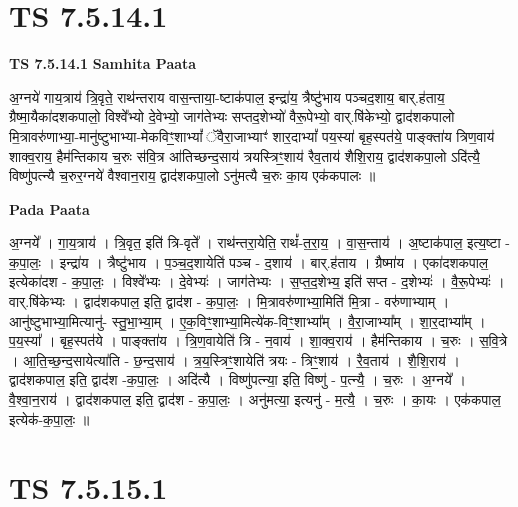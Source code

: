 \documentclass[17pt]{extarticle}
\begin{document}

\section{ TS 7.5.14.1 }

\textbf{TS 7.5.14.1 } \newline
\textbf{Samhita Paata} \newline

अ॒ग्नये॑ गाय॒त्राय॑ त्रि॒वृते॒ राथ॑न्तराय वास॒न्ताया॒-ष्टाक॑पाल॒ इन्द्रा॑य॒ त्रैष्टु॑भाय पञ्चद॒शाय॒ बार्.ह॑ताय॒ ग्रैष्मा॒यैका॑दशकपालो॒ विश्वे᳚भ्यो दे॒वेभ्यो॒ जाग॑तेभ्यः सप्तद॒शेभ्यो॑ वैरू॒पेभ्यो॒ वार्.षि॑केभ्यो॒ द्वाद॑शकपालो मि॒त्रावरु॑णाभ्या॒-मानु॑ष्टुभाभ्या-मेकविꣳ॒॒शाभ्यां᳚ ॅवैरा॒जाभ्याꣳ॑ शार॒दाभ्यां᳚ पय॒स्या॑ बृह॒स्पत॑ये॒ पाङ्क्ता॑य त्रिण॒वाय॑ शाक्व॒राय॒ हैम॑न्तिकाय च॒रुः स॑वि॒त्र आ॑तिच्छन्द॒साय॑ त्रयस्त्रिꣳ॒॒शाय॑ रैव॒ताय॑ शैशि॒राय॒ द्वाद॑शकपा॒लो ऽदि॑त्यै॒ विष्णु॑पत्न्यै च॒रुर॒ग्नये॑ वैश्वान॒राय॒ द्वाद॑शकपा॒लो ऽनु॑मत्यै च॒रुः का॒य एक॑कपालः ॥ \newline

\textbf{Pada Paata} \newline

अ॒ग्नये᳚ । गा॒य॒त्राय॑ । त्रि॒वृत॒ इति॑ त्रि-वृते᳚ । राथ॑न्तरा॒येति॒ राथं᳚-त॒रा॒य॒ । वा॒स॒न्ताय॑ । अ॒ष्टाक॑पाल॒ इत्य॒ष्टा - क॒पा॒लः॒ । इन्द्रा॑य । त्रैष्टु॑भाय । प॒ञ्च॒द॒शायेति॑ पञ्च - द॒शाय॑ । बार्.ह॑ताय । ग्रैष्मा॑य । एका॑दशकपाल॒ इत्येका॑दश - क॒पा॒लः॒ । विश्वे᳚भ्यः । दे॒वेभ्यः॑ । जाग॑तेभ्यः । स॒प्त॒द॒शेभ्य॒ इति॑ सप्त - द॒शेभ्यः॑ । वै॒रू॒पेभ्यः॑ । वार्.षि॑केभ्यः । द्वाद॑शकपाल॒ इति॒ द्वाद॑श - क॒पा॒लः॒ । मि॒त्रावरु॑णाभ्या॒मिति॑ मि॒त्रा - वरु॑णाभ्याम् । आनु॑ष्टुभाभ्या॒मित्यानु॑- स्तु॒भा॒भ्या॒म् । ए॒क॒विꣳ॒॒शाभ्या॒मित्ये॑क-विꣳ॒॒शाभ्या᳚म् । वै॒रा॒जाभ्या᳚म् । शा॒र॒दाभ्या᳚म् । प॒य॒स्या᳚ । बृह॒स्पत॑ये । पाङ्क्ता॑य । त्रि॒ण॒वायेति॑ त्रि - न॒वाय॑ । शा॒क्व॒राय॑ । हैम॑न्तिकाय । च॒रुः । स॒वि॒त्रे । आ॒ति॒च्छ॒न्द॒सायेत्या॑ति - छ॒न्द॒साय॑ । त्र॒य॒स्त्रिꣳ॒॒शायेति॑ त्रयः - त्रिꣳ॒॒शाय॑ । रै॒व॒ताय॑ । शै॒शि॒राय॑ । द्वाद॑शकपाल॒ इति॒ द्वाद॑श -क॒पा॒लः॒ । अदि॑त्यै । विष्णु॑पत्न्या॒ इति॒ विष्णु॑ - प॒त्न्यै॒ । च॒रुः । अ॒ग्नये᳚ । वै॒श्वा॒न॒राय॑ । द्वाद॑शकपाल॒ इति॒ द्वाद॑श - क॒पा॒लः॒ । अनु॑मत्या॒ इत्यनु॑ - म॒त्यै॒ । च॒रुः । का॒यः । एक॑कपाल॒ इत्येक॑-क॒पा॒लः॒ ॥  \newline





\section{ TS 7.5.15.1 }
\end{document}
